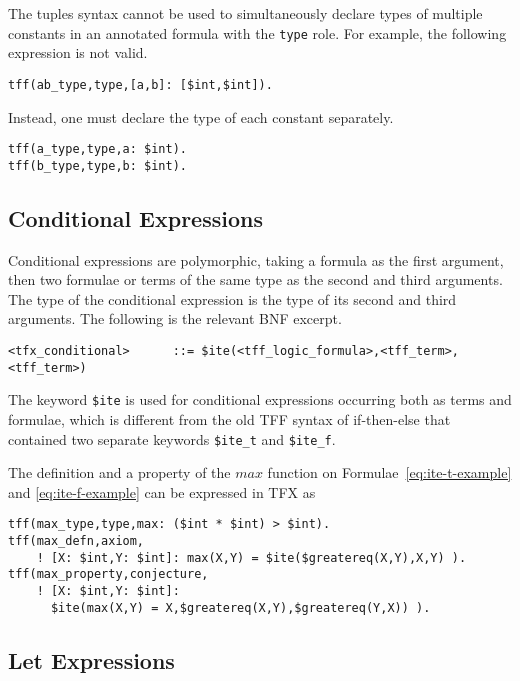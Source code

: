 \documentclass{easychair}
\begin{document}
The tuples syntax cannot be used to simultaneously declare types of multiple constants in an annotated formula with the \verb'type' role. For example, the following expression is not valid.
\begin{verbatim}
tff(ab_type,type,[a,b]: [$int,$int]).
\end{verbatim}
Instead, one must declare the type of each constant separately.
\begin{verbatim}
tff(a_type,type,a: $int).
tff(b_type,type,b: $int).
\end{verbatim}

\subsection{Conditional Expressions}

Conditional expressions are polymorphic, taking a formula as the first 
argument, then two formulae or terms of the same type as the second and 
third arguments. 
The type of the conditional expression is the type of its second and third 
arguments. 
The following is the relevant BNF excerpt.
\begin{verbatim}
<tfx_conditional>      ::= $ite(<tff_logic_formula>,<tff_term>,<tff_term>)
\end{verbatim}

The keyword \verb'$ite' is used for conditional expressions occurring both as
terms and formulae, which is different from the old TFF syntax of if-then-else
that contained two separate keywords \verb'$ite_t' and \verb'$ite_f'.

The definition and a property of the $\mathit{max}$ function on Formulae~\ref{eq:ite-t-example} and \ref{eq:ite-f-example} can be expressed in
TFX as
\begin{verbatim}
tff(max_type,type,max: ($int * $int) > $int).
tff(max_defn,axiom,
    ! [X: $int,Y: $int]: max(X,Y) = $ite($greatereq(X,Y),X,Y) ).
tff(max_property,conjecture,
    ! [X: $int,Y: $int]: 
      $ite(max(X,Y) = X,$greatereq(X,Y),$greatereq(Y,X)) ).
\end{verbatim}

\subsection{Let Expressions}
\end{document}
